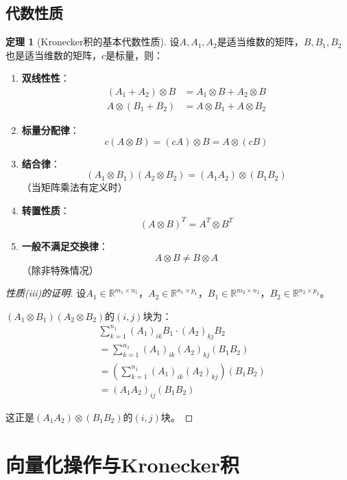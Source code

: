 \documentclass[11pt,a4paper]{ctexart}
\theoremstyle{definition}
\newtheorem{theorem}{定理}[section]
\newcommand{\RR}{\mathbb{R}}
\begin{document}
\subsection{代数性质}

\begin{theorem}[Kronecker积的基本代数性质]
设$A, A_1, A_2$是适当维数的矩阵，$B, B_1, B_2$也是适当维数的矩阵，$c$是标量，则：
\begin{enumerate}[label=(\roman*)]
\item \textbf{双线性性}：
\begin{align}
(A_1 + A_2) \otimes B &= A_1 \otimes B + A_2 \otimes B \\
A \otimes (B_1 + B_2) &= A \otimes B_1 + A \otimes B_2
\end{align}

\item \textbf{标量分配律}：
$$c(A \otimes B) = (cA) \otimes B = A \otimes (cB)$$

\item \textbf{结合律}：
$$(A_1 \otimes B_1)(A_2 \otimes B_2) = (A_1 A_2) \otimes (B_1 B_2)$$
（当矩阵乘法有定义时）

\item \textbf{转置性质}：
$$(A \otimes B)^T = A^T \otimes B^T$$

\item \textbf{一般不满足交换律}：
$$A \otimes B \neq B \otimes A$$ 
（除非特殊情况）
\end{enumerate}
\end{theorem}

\begin{proof}[性质\textnormal{(iii)}的证明]
设$A_1 \in \RR^{m_1 \times n_1}$，$A_2 \in \RR^{n_1 \times p_1}$，$B_1 \in \RR^{m_2 \times n_2}$，$B_2 \in \RR^{n_2 \times p_2}$。

$(A_1 \otimes B_1)(A_2 \otimes B_2)$的$(i,j)$块为：
\begin{align}
&\sum_{k=1}^{n_1} (A_1)_{ik} B_1 \cdot (A_2)_{kj} B_2 \\
&= \sum_{k=1}^{n_1} (A_1)_{ik} (A_2)_{kj} (B_1 B_2) \\
&= \left(\sum_{k=1}^{n_1} (A_1)_{ik} (A_2)_{kj}\right) (B_1 B_2) \\
&= (A_1 A_2)_{ij} (B_1 B_2)
\end{align}

这正是$(A_1 A_2) \otimes (B_1 B_2)$的$(i,j)$块。
\end{proof}

\section{向量化操作与Kronecker积}
\end{document}
